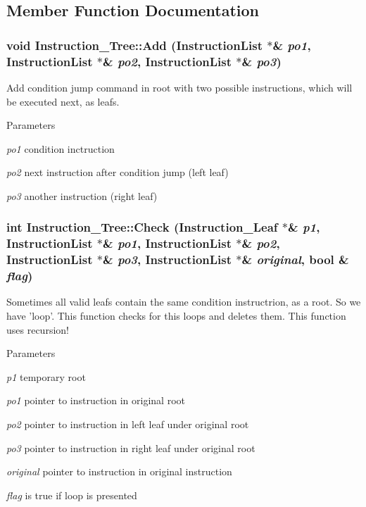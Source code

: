 \subsection{Member Function Documentation}
\hypertarget{classInstruction__Tree_a4c51fc44c6c0fd0d145900231fa1f059}{
\subsubsection[{Add}]{\setlength{\rightskip}{0pt plus 5cm}void Instruction\_\-Tree::Add ({\bf InstructionList} $\ast$\& {\em po1}, \/  {\bf InstructionList} $\ast$\& {\em po2}, \/  {\bf InstructionList} $\ast$\& {\em po3})}}
\label{classInstruction__Tree_a4c51fc44c6c0fd0d145900231fa1f059}
Add condition jump command in root with two possible instructions, which will be executed next, as leafs. 
\begin{DoxyParams}{Parameters}
\item[{\em po1}]condition inctruction \item[{\em po2}]next instruction after condition jump (left leaf) \item[{\em po3}]another instruction (right leaf) \end{DoxyParams}
\hypertarget{classInstruction__Tree_ad9da870498b9d71cbb5a720253016712}{
\subsubsection[{Check}]{\setlength{\rightskip}{0pt plus 5cm}int Instruction\_\-Tree::Check ({\bf Instruction\_\-Leaf} $\ast$\& {\em p1}, \/  {\bf InstructionList} $\ast$\& {\em po1}, \/  {\bf InstructionList} $\ast$\& {\em po2}, \/  {\bf InstructionList} $\ast$\& {\em po3}, \/  {\bf InstructionList} $\ast$\& {\em original}, \/  bool \& {\em flag})}}
\label{classInstruction__Tree_ad9da870498b9d71cbb5a720253016712}
Sometimes all valid leafs contain the same condition instructrion, as a root. So we have 'loop'. This function checks for this loops and deletes them. This function uses recursion! 
\begin{DoxyParams}{Parameters}
\item[{\em p1}]temporary root \item[{\em po1}]pointer to instruction in original root \item[{\em po2}]pointer to instruction in left leaf under original root \item[{\em po3}]pointer to instruction in right leaf under original root \item[{\em original}]pointer to instruction in original instruction \item[{\em flag}]is true if loop is presented \end{DoxyParams}
